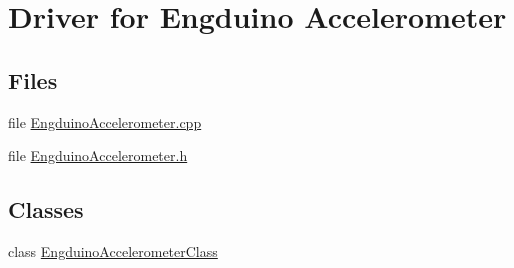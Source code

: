\hypertarget{group___engduino_accelerometer}{}\section{Driver for Engduino Accelerometer}
\label{group___engduino_accelerometer}
\subsection*{Files}
\begin{DoxyCompactItemize}
\item 
file \hyperlink{_engduino_accelerometer_8cpp}{Engduino\+Accelerometer.\+cpp}
\item 
file \hyperlink{_engduino_accelerometer_8h}{Engduino\+Accelerometer.\+h}
\end{DoxyCompactItemize}
\subsection*{Classes}
\begin{DoxyCompactItemize}
\item 
class \hyperlink{class_engduino_accelerometer_class}{Engduino\+Accelerometer\+Class}
\end{DoxyCompactItemize}
